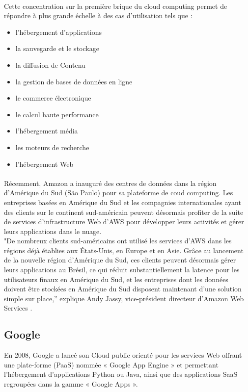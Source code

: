\documentclass[a4paper,12pt]{report}
\begin{document}
\begin{onehalfspace}
	\paragraph*{}
	Cette concentration sur la première brique du cloud computing permet de répondre à plus grande échelle à des cas d'utilisation tels que :
\begin{itemize}
\item l'hébergement d'applications
\item la sauvegarde et le stockage
\item la diffusion de Contenu
\item la gestion de bases de données en ligne
\item le commerce électronique
\item le calcul haute performance
\item l'hébergement média
\item les moteurs de recherche
\item l'hébergement Web
\end{itemize}

	\paragraph*{}
	Récemment, Amazon a inauguré des centres de données dans la région d'Amérique du Sud (São Paulo) pour sa plateforme de coud computing. Les entreprises basées en Amérique du Sud et les compagnies internationales ayant des clients sur le continent sud-américain peuvent désormais profiter de la suite de services d'infrastructure Web d'AWS pour développer leurs activités et gérer leurs applications dans le nuage.\\
"De nombreux clients sud-américains ont utilisé les services d'AWS dans les régions déjà établies aux États-Unis, en Europe et en Asie. Grâce au lancement de la nouvelle région d'Amérique du Sud, ces clients peuvent désormais gérer leurs applications au Brésil, ce qui réduit substantiellement la latence pour les utilisateurs finaux en Amérique du Sud, et les entreprises dont les données doivent être stockées en Amérique du Sud disposent maintenant d'une solution simple sur place,” explique Andy Jassy, vice-président directeur d'Amazon Web Services \cite{source:amazon}.

	\subsection{Google}
	En 2008, Google a lancé son Cloud public orienté pour les services Web offrant une plate-forme (PaaS) nommée « Google App Engine » et permettant l'hébergement d'applications Python ou Java, ainsi que des applications SaaS regroupées dans la gamme « Google Apps ».


\end{onehalfspace}
\end{document}

